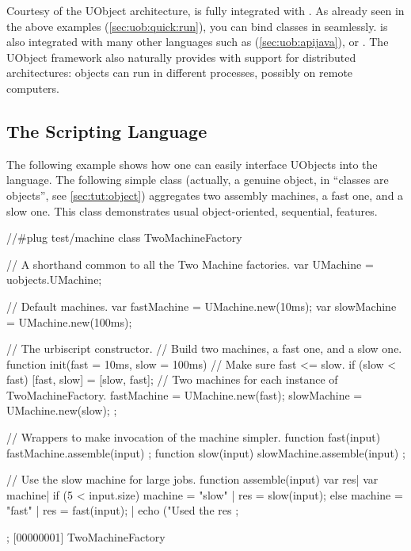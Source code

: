 Courtesy of the UObject architecture, \us is fully integrated with \Cxx. As
already seen in the above examples (\autoref{sec:uob:quick:run}), you can
bind \Cxx classes in \us seamlessly. \us is also integrated with many other
languages such as \Java (\autoref{sec:uob:apijava}), \MatLab or \Python.
The UObject framework also naturally provides \us with support for
distributed architectures: objects can run in different processes, possibly
on remote computers.

\subsection{The \us Scripting Language}

The following example shows how one can easily interface UObjects into the
\us language.  The following simple class (actually, a genuine object, in
\us ``classes are objects'', see \autoref{sec:tut:object}) aggregates two
assembly machines, a fast one, and a slow one.  This class demonstrates
usual object-oriented, sequential, features.

\begin{urbiscript}[firstnumber=1]
//#plug test/machine
class TwoMachineFactory
{
  // A shorthand common to all the Two Machine factories.
  var UMachine = uobjects.UMachine;

  // Default machines.
  var fastMachine = UMachine.new(10ms);
  var slowMachine = UMachine.new(100ms);

  // The urbiscript constructor.
  // Build two machines, a fast one, and a slow one.
  function init(fast = 10ms, slow = 100ms)
  {
    // Make sure fast <= slow.
    if (slow < fast)
      [fast, slow] = [slow, fast];
    // Two machines for each instance of TwoMachineFactory.
    fastMachine = UMachine.new(fast);
    slowMachine = UMachine.new(slow);
  };

  // Wrappers to make invocation of the machine simpler.
  function fast(input) { fastMachine.assemble(input) };
  function slow(input) { slowMachine.assemble(input) };

  // Use the slow machine for large jobs.
  function assemble(input)
  {
    var res|
    var machine|
    if (5 < input.size)
      { machine = "slow" | res = slow(input); }
    else
      { machine = "fast" | res = fast(input); } |
    echo ("Used the %
    res
  };
};
[00000001] TwoMachineFactory
\end{urbiscript}

